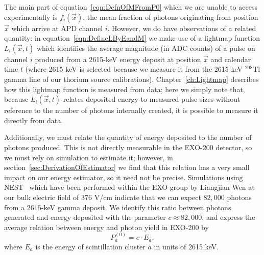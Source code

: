 The main part of equation~\ref{eqn:DefnOfMFromP0} which we are unable to access experimentally is $f_i(\vec{x})$, the mean fraction of photons originating from position $\vec{x}$ which arrive at APD channel $i$.  However, we do have observations of a related quantity: in equation~\ref{eqn:DefineLByEandM} we make use of a lightmap function $L_i(\vec{x}, t)$ which identifies the average magnitude (in ADC counts) of a pulse on channel $i$ produced from a 2615-keV energy deposit at position $\vec{x}$ and calendar time $t$ (where 2615 keV is selected because we measure it from the 2615-keV $^{208}$Tl gamma line of our thorium source calibrations).  Chapter~\ref{ch:Lightmap} describes how this lightmap function is measured from data; here we simply note that, because $L_i(\vec{x}, t)$ relates deposited energy to measured pulse sizes without reference to the number of photons internally created, it is possible to measure it directly from data.

Additionally, we must relate the quantity of energy deposited to the number of photons produced.  This is not directly measurable in the EXO-200 detector, so we must rely on simulation to estimate it; however, in section~\ref{sec:DerivationOfEstimator} we find that this relation has a very small impact on our energy estimator, so it need not be precise.  Simulations using NEST~\cite{NESTpaper} which have been performed within the EXO group by Liangjian Wen at our bulk electric field of 376 V/cm indicate that we can expect $82,000$ photons from a $2615$-keV gamma deposit.  We identify this ratio between photons generated and energy deposited with the parameter $c \approx 82,000$, and express the average relation between energy and photon yield in EXO-200 by
\begin{equation} \label{eqn:DefnOfP0}
P^{(0)}_a = c \cdot E_a,
\end{equation}
where $E_a$ is the energy of scintillation cluster $a$ in units of 2615 keV.

